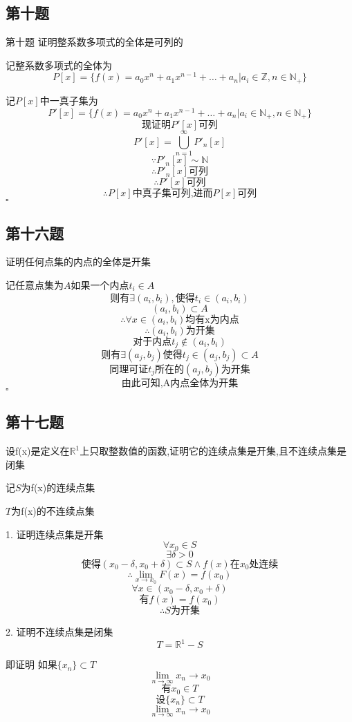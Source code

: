 \documentclass[a4paper]{article}
\begin{document}
    \subsection{第十题}
    第十题 证明整系数多项式的全体是可列的

    记整系数多项式的全体为
    \[P[x]=\{f(x)=a_0x^n+a_1x^{n-1}+\ldots+a_n|a_i \in \mathbb{Z},n\in \mathbb{N_+}\}\]
    
    记$P[x]$中一真子集为
    \[P'[x]=\{f(x)=a_0x^n+a_1x^{n-1}+\ldots+a_n|a_i \in \mathbb{N_+},n\in \mathbb{N_+}\}\]
    \[\text{现证明}P'[x]\text{可列}\]
    \[P'[x] = \bigcup_{n=1}^{\infty} P'_n[x]\]
    \[\because  P'_n[x]\sim \mathbb{N}\]
    \[\therefore P'_n[x]\text{可列}\]
    \[\therefore P'[x]\text{可列}\]
    \[\therefore P[x]\text{中真子集可列,进而}P[x]\text{可列}\]
    \hfill $\square$

    \subsection{第十六题}
    证明任何点集的内点的全体是开集

    记任意点集为$A$如果一个内点$t_i \in A$
    \[\text{则有}\exists (a_i,b_i),\text{使得}t_i \in (a_i,b_i)\]
    \[(a_i,b_i) \subset A\]
    \[\therefore \forall x \in (a_i,b_i)\text{均有x为内点}\]
    \[\therefore (a_i,b_i)\text{为开集}\]
    \[\text{对于内点}t_j\not\in (a_i,b_i)\]
    \[\text{则有}\exists (a_j,b_j)\text{使得}t_j \in (a_j,b_j) \subset A\]
    \[\text{同理可证}t_j\text{所在的}(a_j,b_j)\text{为开集}\]
    \[\text{由此可知,A内点全体为开集}\]
    \hfill $\square$

    \subsection{第十七题}
    设f(x)是定义在$\mathbb{R}^1$上只取整数值的函数,证明它的连续点集是开集,且不连续点集是闭集

    记$S$为f(x)的连续点集
    
    $T$为f(x)的不连续点集

    1. 证明连续点集是开集
    \[\forall x_0 \in S\]
    \[\exists \delta >0\]
    \[\text{使得}(x_0-\delta,x_0+\delta)\subset S\land f(x)\text{在}x_0\text{处连续}\]
    \[\therefore \lim_{x\to x_0}F(x)=f(x_0)\]
    \[\forall x \in (x_0-\delta,x_0+\delta)\]
    \[\text{有}f(x)=f(x_0)\]
    \[\therefore S\text{为开集}\]

    2. 证明不连续点集是闭集
    \[T=\mathbb{R}^1-S\]

    即证明 如果$\{x_n\}\subset T$
    \[\lim_{n \to \infty}x_n \to x_0\]
    \[\text{有}x_0\in T\]
    \[\text{设}\{x_n\}\subset T\]
    \[\lim_{n \to \infty}x_n \to x_0\]
\end{document}
